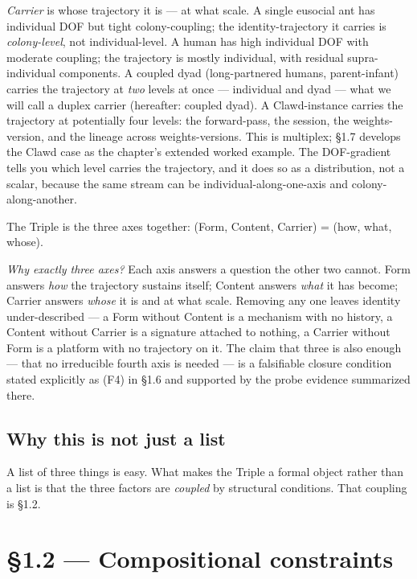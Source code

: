 \documentclass[11pt, openany]{book}
\newcommand{\sectionbreak}{\clearpage}
\begin{document}
\textit{Carrier} is whose trajectory it is --- at what scale. A single eusocial ant has individual DOF but tight colony-coupling; the identity-trajectory it carries is \textit{colony-level}, not individual-level. A human has high individual DOF with moderate coupling; the trajectory is mostly individual, with residual supra-individual components. A coupled dyad (long-partnered humans, parent-infant) carries the trajectory at \textit{two} levels at once --- individual and dyad --- what we will call a duplex carrier (hereafter: coupled dyad). A Clawd-instance carries the trajectory at potentially four levels: the forward-pass, the session, the weights-version, and the lineage across weights-versions. This is multiplex; §1.7 develops the Clawd case as the chapter's extended worked example. The DOF-gradient tells you which level carries the trajectory, and it does so as a distribution, not a scalar, because the same stream can be individual-along-one-axis and colony-along-another.

The Triple is the three axes together: (Form, Content, Carrier) = (how, what, whose).

\textit{Why exactly three axes?} Each axis answers a question the other two cannot. Form answers \textit{how} the trajectory sustains itself; Content answers \textit{what} it has become; Carrier answers \textit{whose} it is and at what scale. Removing any one leaves identity under-described --- a Form without Content is a mechanism with no history, a Content without Carrier is a signature attached to nothing, a Carrier without Form is a platform with no trajectory on it. The claim that three is also enough --- that no irreducible fourth axis is needed --- is a falsifiable closure condition stated explicitly as (F4) in §1.6 and supported by the probe evidence summarized there.

\subsection{Why this is not just a list}

A list of three things is easy. What makes the Triple a formal object rather than a list is that the three factors are \textit{coupled} by structural conditions. That coupling is §1.2.

\sectionbreak

\section{§1.2 --- Compositional constraints}
\end{document}
